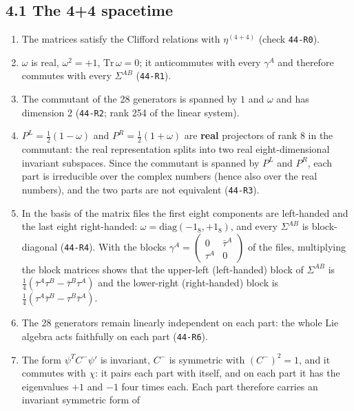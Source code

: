 \documentclass[
  10pt,
]{article}
\providecommand{\tightlist}{%
  \setlength{\itemsep}{0pt}\setlength{\parskip}{0pt}}
\begin{document}
\hypertarget{the-44-spacetime}{%
\subsection{4.1 The 4+4 spacetime}\label{the-44-spacetime}}

\begin{enumerate}
\def\labelenumi{\arabic{enumi}.}
\tightlist
\item
  The matrices satisfy the Clifford relations with \(\eta^{(4+4)}\)
  (check \texttt{44-R0}).
\item
  \(\omega\) is real, \(\omega^2=+1\), \(\mathrm{Tr}\,\omega=0\); it
  anticommutes with every \(\gamma^A\) and therefore commutes with every
  \(\Sigma^{AB}\) (\texttt{44-R1}).
\item
  The commutant of the 28 generators is spanned by \(1\) and \(\omega\)
  and has dimension 2 (\texttt{44-R2}; rank 254 of the linear system).
\item
  \(P^L=\tfrac12(1-\omega)\) and \(P^R=\tfrac12(1+\omega)\) are
  \textbf{real} projectors of rank 8 in the commutant: the real
  representation splits into two real eight-dimensional invariant
  subspaces. Since the commutant is spanned by \(P^L\) and \(P^R\), each
  part is irreducible over the complex numbers (hence also over the real
  numbers), and the two parts are not equivalent (\texttt{44-R3}).
\item
  In the basis of the matrix files the first eight components are
  left-handed and the last eight right-handed:
  \(\omega=\mathrm{diag}(-1_8,+1_8)\), and every \(\Sigma^{AB}\) is
  block-diagonal (\texttt{44-R4}). With the blocks
  \(\gamma^A=\begin{pmatrix}0&\bar\tau^A\\ \tau^A&0\end{pmatrix}\) of
  the files, multiplying the block matrices shows that the upper-left
  (left-handed) block of \(\Sigma^{AB}\) is
  \(\tfrac14(\bar\tau^A\tau^B-\bar\tau^B\tau^A)\) and the lower-right
  (right-handed) block is
  \(\tfrac14(\tau^A\bar\tau^B-\tau^B\bar\tau^A)\).
\item
  The 28 generators remain linearly independent on each part: the whole
  Lie algebra acts faithfully on each part (\texttt{44-R6}).
\item
  The form \(\psi^TC^-\psi'\) is invariant, \(C^-\) is symmetric with
  \((C^-)^2=1\), and it commutes with \(\chi\): it pairs each part with
  itself, and on each part it has the eigenvalues \(+1\) and \(-1\) four
  times each. Each part therefore carries an invariant symmetric form of

\end{enumerate}
\end{document}

